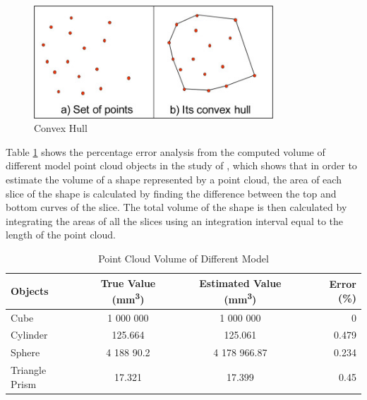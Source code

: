 \begin{figure}[H]
	\centering
	\includegraphics[width=0.8\textwidth]{Figures/convex hull.jpg}
	\caption{Convex Hull}
	\label{fig:convex hull}
\end{figure}

Table \ref{tab:Point Cloud Volume of Different Objects} shows the percentage error analysis from the computed volume of different model point cloud objects in the study of \citet{chang2017}, which shows that in order to estimate the volume of a shape represented by a point cloud, the area of each slice of the shape is calculated by finding the difference between the top and bottom curves of the slice. The total volume of the shape is then calculated by integrating the areas of all the slices using an integration interval equal to the length of the point cloud.

\begin{table}[H]
	\caption{Point Cloud Volume of Different Model}
	\label{tab:Point Cloud Volume of Different Objects}
	\centering
	\begin{tabular}{l c c r}
		\toprule
		\textbf{Objects} & \textbf{True Value (\si{mm^3})} & \textbf{Estimated Value (\si{mm^3})} & \textbf{Error} (\%) \\
		\midrule
		Cube             & 1 000 000                       & 1 000 000                            & 0                   \\

		Cylinder         & 125.664                         & 125.061                              & 0.479               \\

		Sphere           & 4 188 90.2                      & 4 178 966.87                         & 0.234               \\

		Triangle Prism   & 17.321                          & 17.399                               & 0.45                \\
		\bottomrule
	\end{tabular}
\end{table}

